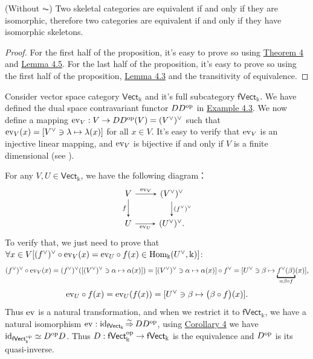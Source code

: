 \documentclass{article}
\begin{document}
\begin{cor}
	(Without $\AC$) Two skeletal categories are equivalent if and only if they are isomorphic, therefore two categories are equivalent if and only if they have isomorphic skeletons.
\end{cor}

\begin{proof}
	For the first half of the proposition, it's easy to prove so using \hyperref[equ fct]{Theorem 4} and \hyperref[l4]{Lemma 4.5}. For the last half of the proposition, it's easy to prove so using the first half of the proposition, \hyperref[l4]{Lemma 4.3} and the transitivity of equivalence.
\end{proof}


\begin{exm}\label{dual v}
	Consider vector space category $\mathsf{Vect}_\Bbbk$ and it's full subcategory $\mathsf{fVect}_\Bbbk$. We have defined the dual space contravariant functor $DD^\mathrm{op}$ in \hyperref[func]{Example 4.3}. We now define a mapping $\mathrm{ev}_V:V\to DD^\mathrm{op}(V)=(V^\vee)^\vee$ such that $\mathrm{ev}_V(x)=[V^\vee\ni\lambda\mapsto\lambda(x)]$ for all $x\in V$. It's easy to verify that $\mathrm{ev}_V$ is an injective linear mapping, and $\mathrm{ev}_V$ is bijective if and only if $V$ is a finite dimensional (see \cite[\S1.3 定理 2]{alg-3}).
	
	For any $V,U\in\mathsf{Vect}_\Bbbk$, we have the following diagram：
	\[\begin{tikzcd}
		V \arrow[->,>=stealth,d, "f"'] \arrow[->,>=stealth,r, "\ev_V"] & (V^\vee)^\vee \arrow[->,>=stealth,d, "(f^\vee)^\vee"]\\
		U \arrow[->,>=stealth,r, "\ev_U"'] & (U^\vee)^\vee.
	\end{tikzcd}\]
	To verify that, we just need to prove that $\forall x\in V[(f^\vee)^\vee\circ\mathrm{ev}_V(x)=\mathrm{ev}_U\circ f(x)\in\mathrm{Hom}_\Bbbk(U^\vee,\Bbbk)]$:
		$$(f^\vee)^\vee\circ\ev_V(x)=(f^\vee)^\vee([(V^\vee)^\vee\ni\alpha\mapsto\alpha(x)])=[(V^\vee)^\vee\ni\alpha\mapsto\alpha(x)]\circ f^\vee=[U^\vee\ni\beta\mapsto\underbracket{f^\vee(\beta)}_{=\beta\circ f}(x)],$$
		$$\mathrm{ev}_U\circ f(x)=\mathrm{ev}_U(f(x))=[U^\vee\ni\beta\mapsto\big(\beta\circ f\big)(x)].$$
	Thus $\mathrm{ev}$ is a natural transformation, and when we restrict it to $\mathsf{fVect}_\Bbbk$, we have a natural isomorphism $\mathrm{ev}:\mathrm{id}_{\mathsf{fVect}_\Bbbk}\mathop{\Rightarrow}\limits^{\sim} DD^\mathrm{op}$, using \hyperref[op]{Corollary 4} we have $\mathrm{id}_{\mathsf{fVect}^\mathrm{op}_\Bbbk}\simeq D^\mathrm{op} D$. Thus $D:\mathsf{fVect}^\mathrm{op}_\Bbbk\to\mathsf{fVect}_\Bbbk$ is the equivalence and $D^\mathrm{op}$ is its quasi-inverse.
\end{exm}
\end{document}
